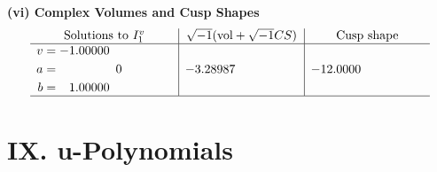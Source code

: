 \documentclass[1p]{elsarticle_modified}
\theoremstyle{definition}
\newcommand{\I}{\sqrt{-1}}
\begin{document}
\newpage\flushleft \textbf{(vi) Complex Volumes and Cusp Shapes}
$$\begin{array}{c|c|c}  
\text{Solutions to }I^v_{1}& \I (\text{vol} + \sqrt{-1}CS) & \text{Cusp shape}\\
 \hline 
\begin{aligned}
v &= -1.00000\phantom{ +0.000000I} \\
a &= \phantom{-0.000000 } 0 \\
b &= \phantom{-}1.00000\phantom{ +0.000000I}\end{aligned}
 & -3.28987\phantom{ +0.000000I} & -12.0000\phantom{ +0.000000I}\\
 \hline 
 \end{array}$$\newpage
\newpage\renewcommand{\arraystretch}{1}
\centering \section*{ IX. u-Polynomials}
\end{document}
